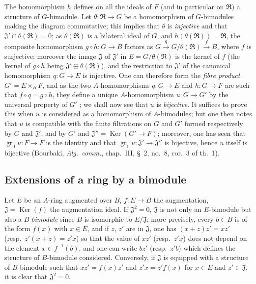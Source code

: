 \begin{env}[18.1.7]
The homomorphism $h$ defines on all the ideals of $F$ (and in particular on $\mathfrak{R}$) a structure of $G$-bimodule.
Let $\theta:\mathfrak{R}\to G$ be a homomorphism of $G$-bimodules making the diagram  commutative; this implies that $\theta$ is \emph{injective} and that $\mathfrak{J}'\cap\theta(\mathfrak{R})=0$; as $\theta(\mathfrak{R})$ is a bilateral ideal of $G$, and $h(\theta(\mathfrak{R}))=\mathfrak{R}$, the composite homomorphism $g\circ h:G\to B$ factors as $G\xrightarrow{q}G/\theta(\mathfrak{R})\xrightarrow{f}B$, where $f$ is surjective; moreover the image $\mathfrak{J}$ of $\mathfrak{J}'$ in $E=G/\theta(\mathfrak{R})$ is the kernel of $f$ (the kernel of $g\circ h$ being $\mathfrak{J}'\oplus\theta(\mathfrak{R})$), and the restriction to $\mathfrak{J}'$ of the canonical homomorphism $q:G\to E$ is injective.
One can therefore form the \emph{fibre product} $G'=E\times_B F$, and as the two $A$-homomorphisms $q:G\to E$ and $h:G\to F$ are such that $f\circ q=g\circ h$, they define a unique $A$-homomorphism $u:G\to G'$ by the universal property of $G'$ ; we shall now see that $u$ is \emph{bijective}.
It suffices to prove this when $u$ is considered as a homomorphism of $A$-bimodules; but one then notes that $u$ is compatible with the finite filtrations on $G$ and $G'$ formed respectively by $G$ and $\mathfrak{J}'$, and by $G'$ and $\mathfrak{J}''=\operatorname{Ker}(G'\to F)$; moreover, one has seen  that $\operatorname{gr}_0 u:F\to F$ is the identity and that $\operatorname{gr}_1 u:\mathfrak{J}'\to\mathfrak{J}''$ is bijective, hence $u$ itself is bijective (Bourbaki, \emph{Alg.\ comm.}, chap.~III, \S~2, no.~8, cor.~3 of th.~1).
\end{env}

\subsection{Extensions of a ring by a bimodule}
\label{subsection:0.18.2}

\begin{env}[18.2.1]
\label{0.18.2.1}
Let $E$ be an $A$-ring augmented over $B$, $f:E\to B$ the augmentation, $\mathfrak{J}=\operatorname{Ker}(f)$ the augmentation ideal.
If $\mathfrak{J}^2=0$, $\mathfrak{J}$ is not only an $E$-bimodule but also a $B$-\emph{bimodule} since $B$ is isomorphic to $E/\mathfrak{J}$; more precisely, every $b\in B$ is of the form $f(x)$ with $x\in E$, and if $z$, $z'$ are in $\mathfrak{J}$, one has $(x+z)z'=xz'$ (resp.\ $z'(x+z)=z'x$) so that the value of $xz'$ (resp.\ $z'x$) does not depend on the element $x\in f^{-1}(b)$, and one can write $bz'$ (resp.\ $z'b$) which defines the structure of $B$-bimodule considered.
Conversely, if $\mathfrak{J}$ is equipped with a structure of $B$-bimodule such that $xz'=f(x)z'$ and $z'x=z'f(x)$ for $x\in E$ and $z'\in\mathfrak{J}$, it is clear that $\mathfrak{J}^2=0$.
\end{env}

